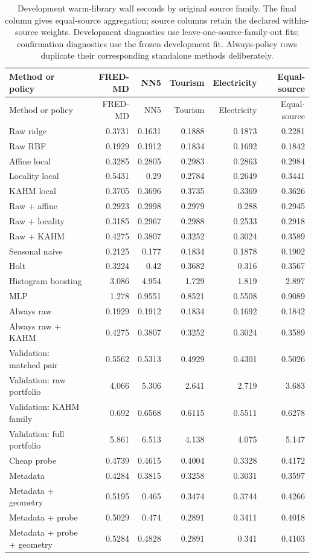 {\small\setlength{\tabcolsep}{4pt}
\begin{longtable}{lrrrrr}
\caption{Development warm-library wall seconds by original source family. The final column gives equal-source aggregation; source columns retain the declared within-source weights. Development diagnostics use leave-one-source-family-out fits; confirmation diagnostics use the frozen development fit. Always-policy rows duplicate their corresponding standalone methods deliberately.}\label{tab:source-development-cost}\\
\toprule
Method or policy & FRED-MD & NN5 & Tourism & Electricity & Equal-source \\
\midrule
\endfirsthead
\toprule
Method or policy & FRED-MD & NN5 & Tourism & Electricity & Equal-source \\
\midrule
\endhead
Raw ridge & 0.3731 & 0.1631 & 0.1888 & 0.1873 & 0.2281 \\
Raw RBF & 0.1929 & 0.1912 & 0.1834 & 0.1692 & 0.1842 \\
Affine local & 0.3285 & 0.2805 & 0.2983 & 0.2863 & 0.2984 \\
Locality local & 0.5431 & 0.29 & 0.2784 & 0.2649 & 0.3441 \\
KAHM local & 0.3705 & 0.3696 & 0.3735 & 0.3369 & 0.3626 \\
Raw + affine & 0.2923 & 0.2998 & 0.2979 & 0.288 & 0.2945 \\
Raw + locality & 0.3185 & 0.2967 & 0.2988 & 0.2533 & 0.2918 \\
Raw + KAHM & 0.4275 & 0.3807 & 0.3252 & 0.3024 & 0.3589 \\
Seasonal naive & 0.2125 & 0.177 & 0.1834 & 0.1878 & 0.1902 \\
Holt & 0.3224 & 0.42 & 0.3682 & 0.316 & 0.3567 \\
Histogram boosting & 3.086 & 4.954 & 1.729 & 1.819 & 2.897 \\
MLP & 1.278 & 0.9551 & 0.8521 & 0.5508 & 0.9089 \\
Always raw & 0.1929 & 0.1912 & 0.1834 & 0.1692 & 0.1842 \\
Always raw + KAHM & 0.4275 & 0.3807 & 0.3252 & 0.3024 & 0.3589 \\
Validation: matched pair & 0.5562 & 0.5313 & 0.4929 & 0.4301 & 0.5026 \\
Validation: raw portfolio & 4.066 & 5.306 & 2.641 & 2.719 & 3.683 \\
Validation: KAHM family & 0.692 & 0.6568 & 0.6115 & 0.5511 & 0.6278 \\
Validation: full portfolio & 5.861 & 6.513 & 4.138 & 4.075 & 5.147 \\
Cheap probe & 0.4739 & 0.4615 & 0.4004 & 0.3328 & 0.4172 \\
Metadata & 0.4284 & 0.3815 & 0.3258 & 0.3031 & 0.3597 \\
Metadata + geometry & 0.5195 & 0.465 & 0.3474 & 0.3744 & 0.4266 \\
Metadata + probe & 0.5029 & 0.474 & 0.2891 & 0.3411 & 0.4018 \\
Metadata + probe + geometry & 0.5284 & 0.4828 & 0.2891 & 0.341 & 0.4103 \\
\bottomrule
\end{longtable}
}

